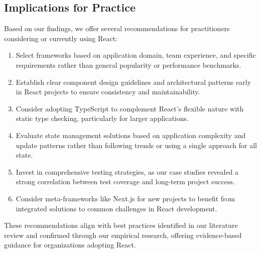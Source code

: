 \subsection{Implications for Practice}
Based on our findings, we offer several recommendations for practitioners considering or currently using React:

\begin{enumerate}
    \item Select frameworks based on application domain, team experience, and specific requirements rather than general popularity or performance benchmarks.
    \item Establish clear component design guidelines and architectural patterns early in React projects to ensure consistency and maintainability.
    \item Consider adopting TypeScript to complement React's flexible nature with static type checking, particularly for larger applications.
    \item Evaluate state management solutions based on application complexity and update patterns rather than following trends or using a single approach for all state.
    \item Invest in comprehensive testing strategies, as our case studies revealed a strong correlation between test coverage and long-term project success.
    \item Consider meta-frameworks like Next.js for new projects to benefit from integrated solutions to common challenges in React development.
\end{enumerate}

These recommendations align with best practices identified in our literature review and confirmed through our empirical research, offering evidence-based guidance for organizations adopting React.
